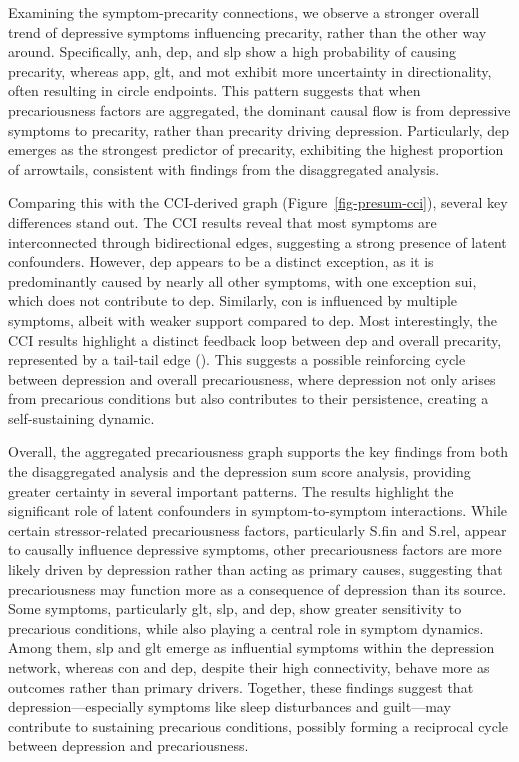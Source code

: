 \documentclass[
]{article}
\begin{document}
Examining the symptom-precarity connections, we observe a stronger
overall trend of depressive symptoms influencing precarity, rather than
the other way around. Specifically, anh, dep, and slp show a high
probability of causing precarity, whereas app, glt, and mot exhibit more
uncertainty in directionality, often resulting in circle endpoints. This
pattern suggests that when precariousness factors are aggregated, the
dominant causal flow is from depressive symptoms to precarity, rather
than precarity driving depression. Particularly, dep emerges as the
strongest predictor of precarity, exhibiting the highest proportion of
arrowtails, consistent with findings from the disaggregated analysis.

Comparing this with the CCI-derived graph (Figure~\ref{fig-presum-cci}),
several key differences stand out. The CCI results reveal that most
symptoms are interconnected through bidirectional edges, suggesting a
strong presence of latent confounders. However, dep appears to be a
distinct exception, as it is predominantly caused by nearly all other
symptoms, with one exception sui, which does not contribute to dep.
Similarly, con is influenced by multiple symptoms, albeit with weaker
support compared to dep. Most interestingly, the CCI results highlight a
distinct feedback loop between dep and overall precarity, represented by
a tail-tail edge (\textemdash ). This suggests a possible reinforcing
cycle between depression and overall precariousness, where depression
not only arises from precarious conditions but also contributes to their
persistence, creating a self-sustaining dynamic.

Overall, the aggregated precariousness graph supports the key findings
from both the disaggregated analysis and the depression sum score
analysis, providing greater certainty in several important patterns. The
results highlight the significant role of latent confounders in
symptom-to-symptom interactions. While certain stressor-related
precariousness factors, particularly S.fin and S.rel, appear to causally
influence depressive symptoms, other precariousness factors are more
likely driven by depression rather than acting as primary causes,
suggesting that precariousness may function more as a consequence of
depression than its source. Some symptoms, particularly glt, slp, and
dep, show greater sensitivity to precarious conditions, while also
playing a central role in symptom dynamics. Among them, slp and glt
emerge as influential symptoms within the depression network, whereas
con and dep, despite their high connectivity, behave more as outcomes
rather than primary drivers. Together, these findings suggest that
depression---especially symptoms like sleep disturbances and guilt---may
contribute to sustaining precarious conditions, possibly forming a
reciprocal cycle between depression and precariousness.
\end{document}
